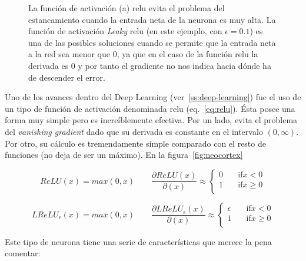 \begin{figure}[t]
	\centering
	\qquad
	\caption[Funciones de activación: \acrshort{relu} y Leaky-\acrshort{relu}.]{La función de activación (a) \gls{relu} evita el problema del estancamiento cuando la entrada neta de la neurona es muy alta. La función de activación \textit{Leaky} \gls{relu} (en este ejemplo, con $\epsilon = 0.1$) es una de las posibles soluciones cuando se permite que la entrada neta a la red sea menor que 0, ya que en el caso de la función \gls{relu} la derivada es 0 y por tanto el gradiente no nos indica hacia dónde ha de descender el error.}
	\label{fig:relu-and-leaky-relu}
\end{figure}

Uno de los avances dentro del Deep Learning (ver~\ref{ss:deep-learning}) fue el uso de un tipo de función de activación denominada \acrfull{relu} (eq.~\ref{eq:relu}). Ésta posee una forma muy simple pero es increíblemente efectiva. Por un lado, evita el problema del \textit{vanishing gradient} dado que su derivada es constante en el intervalo $(0, \infty)$. Por otro, su cálculo es tremendamente simple comparado con el resto de funciones (no deja de ser un máximo). En la figura~\ref{fig:neocortex}

\begin{equation}
ReLU(x) = max(0, x) \qquad
\frac{\partial ReLU(x)}{\partial(x)} \approx
\begin{cases}
0 &\quad\text{if} x < 0 \\
1 &\quad\text{if} x \geq 0 \\
\end{cases}
\label{eq:relu}
\end{equation}

\begin{equation}
LReLU_\epsilon(x) = max(0, x) \qquad
\frac{\partial LReLU_\epsilon(x)}{\partial(x)} \approx
\begin{cases}
\epsilon &\quad\text{if} x < 0 \\
1 &\quad\text{if} x \geq 0 \\
\end{cases}
\label{eq:leaky-relu}
\end{equation}

Este tipo de neurona tiene una serie de características que merece la pena comentar:

